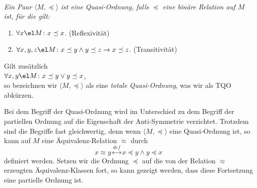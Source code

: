 \begin{Definition}  \hspace*{\fill} \\
{\em
  Ein Paar $\langle M, \preceq\rangle$ ist eine \emph{Quasi-Ordnung}, falls $\preceq$ eine
  bin\"are Relation auf $M$ ist, f\"ur die gilt:
  \begin{enumerate}
  \item $\forall x \el M \colon x \preceq x$. \hspace*{\fill} (Reflexivit\"at)
  \item $\forall x, y, z \el M \colon x \preceq y \wedge y \preceq z \rightarrow x \preceq
    z$. \hspace*{\fill} (Transitivit\"at)
  \end{enumerate}
  Gilt zus\"atzlich \\[0.1cm]
  \hspace*{1.3cm} $\forall x, y \el M \colon x \preceq y \vee y \preceq x$, \\[0.1cm]
  so bezeichnen wir $\langle M, \preceq \rangle$ als eine \emph{totale Quasi-Ordnung}, was
  wir als \textsc{TQO} abk\"urzen.
}
\end{Definition}
Bei dem Begriff der Quasi-Ordnung wird im Unterschied zu dem Begriff der partiellen Ordnung auf die
Eigenschaft der Anti-Symmetrie verzichtet.  Trotzdem sind die Begriffe fast gleichwertig, denn wenn
$\langle M, \preceq \rangle$ eine Quasi-Ordnung ist, so kann auf $M$ eine Äquivalenz-Relation
$\approx$ durch 
\[ x \approx y \stackrel{def}{\longleftrightarrow} x \preceq y \wedge y \preceq x \]
definiert werden.
Setzen wir die Ordnung $\preceq$ auf die von der Relation $\approx$ erzeugten Äquivalenz-Klassen
fort,  so kann gezeigt werden, dass diese Fortsetzung eine partielle Ordnung ist.
\vspace*{0.3cm}

